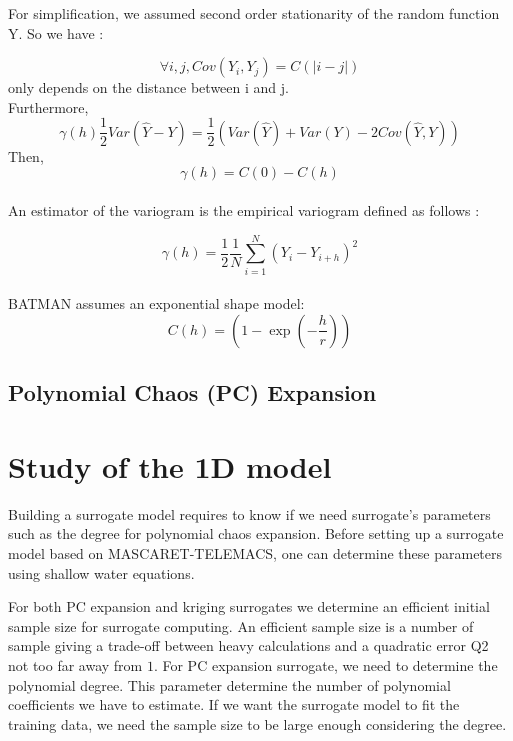 \documentclass[hidelinks,12pt]{article}
\begin{document}
For simplification, we assumed second order stationarity of the random function Y. So we have :

$$\forall i,j, Cov(Y_i,Y_{j})=C(|i-j|)$$ only depends on the distance between i and j.
\\
Furthermore, $$\gamma(h)\frac{1}{2}Var(\hat{Y}-Y)=\frac{1}{2}(Var(\hat{Y})+Var(Y)-2Cov(\hat{Y},Y))$$
Then,$$\gamma(h)=C(0)-C(h)$$
\\
An estimator of the variogram is the empirical variogram defined as follows :

$$\gamma(h)=\frac{1}{2} \frac{1}{N} \sum_{i=1}^{N} (Y_i - Y_{i+h})^2$$
\\
BATMAN assumes an exponential shape model: 
$$C(h)=\left(1- \exp{\left(-\frac{h}{r}\right)}\right)$$

\subsection{Polynomial Chaos (PC) Expansion}




\section{Study of the 1D model}

Building a surrogate model requires to know if we need surrogate's parameters such as the degree for polynomial chaos expansion. Before setting up a surrogate model based on MASCARET-TELEMACS, one can determine these parameters using shallow water equations.

For both PC expansion and kriging surrogates we determine an efficient initial sample size for surrogate computing. An efficient sample size is a number of sample giving a trade-off between heavy calculations and a quadratic error Q2 not too far away from $1$. For PC expansion surrogate, we need to determine the polynomial degree. This parameter determine the number of polynomial coefficients we have to estimate. If we want the surrogate model to fit the training data, we need the sample size to be large enough considering the degree.

\end{document}
